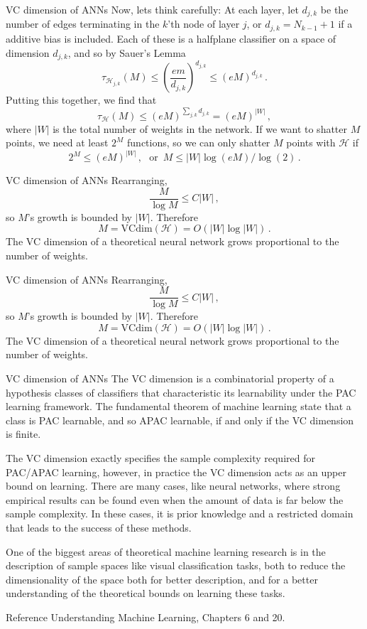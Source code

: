 \documentclass[10pt, table, dvipsnames, handout]{beamer}
\newcommand{\cH}{\ensuremath{\mathcal{H}}}
\begin{document}
\begin{frame}[fragile]{VC dimension of ANNs}
Now, lets think carefully: At each layer, let $d_{j,k}$ be the number of edges terminating in the $k$'th node of layer $j$, or $d_{j,k} =  N_{k-1}+1$ if a additive bias is included. Each of these is a halfplane classifier on a space of dimension $d_{j,k}$, and so by Sauer's Lemma
$$
\tau_{\cH_{j,k}}(M)\leq \left( \frac{em}{d_{j,k}} \right)^{d_{j,k}} \leq (e M)^{d_{j,k}}\,.
$$
\pause
Putting this together, we find that 
$$
\tau_{\cH}(M)\leq (e M)^{\sum_{j,k} d_{j,k}} = (eM)^{|W|}\,,
$$
where $|W|$ is the total number of weights in the network. \pause If we want to shatter $M$ points, we need at least $2^{M}$ functions, so we can only shatter $M$ points with $\cH$ if
$$
2^M\leq (eM)^{|W|}\,,\,\,\,\,\text{or}\,\,\, M\leq |W|\log(eM)/\log(2)\,.
$$
\end{frame}



\begin{frame}[fragile]{VC dimension of ANNs}
Rearranging, 
$$
\frac{M}{\log M} \leq C |W|\,,
$$
so $M$'s growth is bounded by $|W|$. Therefore 
$$
M = \text{VCdim}(\cH)  = O(|W|\log |W|)\,.
$$
The VC dimension of a theoretical neural network grows proportional to the number of weights. 
\end{frame}




\begin{frame}[fragile]{VC dimension of ANNs}
Rearranging, 
$$
\frac{M}{\log M} \leq C |W|\,,
$$
so $M$'s growth is bounded by $|W|$. Therefore 
$$
M = \text{VCdim}(\cH)  = O(|W|\log |W|)\,.
$$
The VC dimension of a theoretical neural network grows proportional to the number of weights. 
\end{frame}


\begin{frame}[fragile]{VC dimension of ANNs}
The VC dimension is a combinatorial property of a hypothesis classes of classifiers that characteristic its  learnability under the PAC learning framework. The fundamental theorem of machine learning state that a class is PAC learnable, and so APAC learnable, if and only if the VC dimension is finite. \pause

The VC dimension exactly specifies the sample complexity required for PAC/APAC learning, however, in practice the VC dimension acts as an upper bound on learning. There are many cases, like neural networks, where strong empirical results can be found even when the amount of data is far below the sample complexity. In these cases, it is prior knowledge and a restricted domain that leads to the success of these methods. \pause

One of the biggest areas of theoretical machine learning research is in the description of sample spaces like visual classification tasks, both to reduce the dimensionality of the space both for better description, and for a better understanding of the theoretical bounds on learning these tasks.  
\end{frame}





\begin{frame}[fragile]{Reference}
Understanding Machine Learning, Chapters 6 and 20. 
\end{frame}
\end{document}
